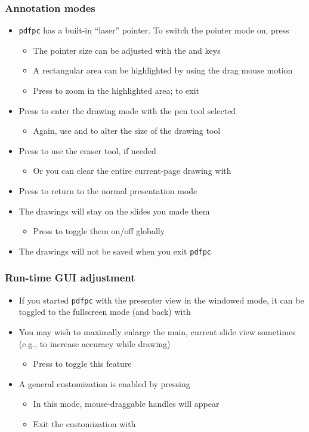 \documentclass{beamer}
\newcommand{\singleitem}[1]{\begin{itemize}\item #1\end{itemize}}
\newcommand{\pdfpc}{\texttt{pdfpc}\xspace}
\begin{document}
\begin{frame}
  \frametitle{Annotation modes}
  \begin{itemize}
    \item \pdfpc has a built-in ``laser'' pointer. To switch the pointer
      mode on, press 
      \begin{itemize}
        \item The pointer size can be adjusted with the \keys{{+}} and \keys{-}
          keys
        \item A rectangular area can be highlighted by using the drag mouse
          motion
        \item Press  to zoom in the highlighted area;  to exit
      \end{itemize}
    \item Press  to enter the drawing mode with the pen tool selected
      \singleitem{Again, use \keys{{+}} and \keys{-} to alter the size of the
        drawing tool}
    \item Press  to use the eraser tool, if needed
      \singleitem{Or you can clear the entire current-page drawing with
        \keys{C}}
    \item Press  to return to the normal presentation mode
    \item The drawings will stay on the slides you made them
      \singleitem{Press  to toggle them on/off globally}
    \item The drawings will \alert{not} be saved when you exit \pdfpc
  \end{itemize}
\end{frame}

\begin{frame}
  \frametitle{Run-time GUI adjustment}
  \begin{itemize}
    \item If you started \pdfpc with the presenter view in the windowed mode,
      it can be toggled to the fullscreen mode (and back) with 
    \item You may wish to maximally enlarge the main, current slide
      view sometimes (e.g., to increase accuracy while drawing)
      \singleitem{Press  to toggle this feature}
    \item A general customization is enabled by pressing 
      \singleitem{In this mode, mouse-draggable handles will appear}
      \singleitem{Exit the customization with }
  \end{itemize}
\end{frame}
\end{document}
